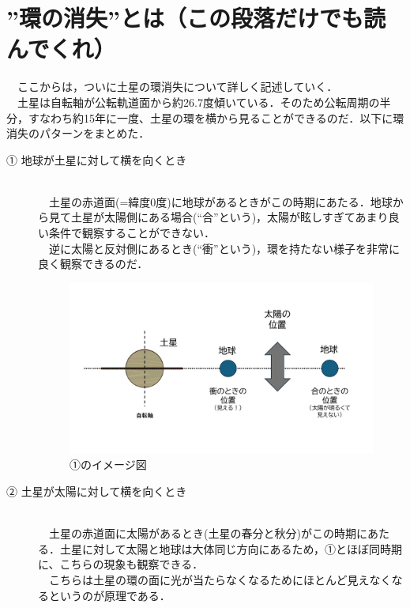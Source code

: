 \documentclass[../main]{subfiles}
\begin{document}
\newpage

\section{”環の消失”とは（この段落だけでも読んでくれ）}
　ここからは，ついに土星の環消失について詳しく記述していく．\\
　土星は自転軸が公転軌道面から約26.7度傾いている．そのため公転周期の半分，すなわち約15年に一度、土星の環を横から見ることができるのだ．以下に環消失のパターンをまとめた．


\begin{description}
    \item[① 地球が土星に対して横を向くとき]\mbox{}\\
    　土星の赤道面(=緯度0度)に地球があるときがこの時期にあたる．地球から見て土星が太陽側にある場合(``合''という)，太陽が眩しすぎてあまり良い条件で観察することができない．\\
　逆に太陽と反対側にあるとき(``衝''という)，環を持たない様子を非常に良く観察できるのだ．
\begin{figure}[H]
    \centering
    \includegraphics[width=14cm]{sections/kurahara/部誌用/スライド1.JPG}
    \caption{①のイメージ図}
\end{figure}


    \item [② 土星が太陽に対して横を向くとき]\mbox{}\\
    　土星の赤道面に太陽があるとき(土星の春分と秋分)がこの時期にあたる．土星に対して太陽と地球は大体同じ方向にあるため，①とほぼ同時期に、こちらの現象も観察できる．\\
　こちらは土星の環の面に光が当たらなくなるためにほとんど見えなくなるというのが原理である．


\end{description}
\end{document}
